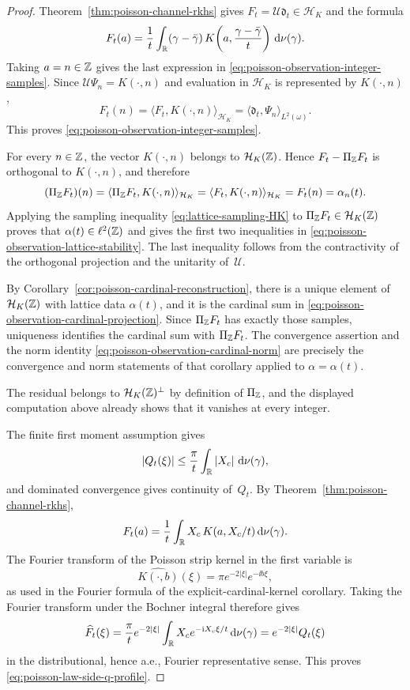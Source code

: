 \begin{proof}
Theorem~\ref{thm:poisson-channel-rkhs} gives
$F_t=\mathcal U\mathfrak d_t\in\mathcal H_K$ and the formula
\[
F_t(a)=\frac1t\int_{\mathbb{R}}
(\gamma-\bar{\gamma})\,
K\!\left(a,\frac{\gamma-\bar{\gamma}}{t}\right)\,\mathrm{d}\nu(\gamma).
\]
Taking $a=n\in\mathbb{Z}$ gives the last expression in
\eqref{eq:poisson-observation-integer-samples}.  Since
$\mathcal U\Psi_n=K(\cdot,n)$ and evaluation in $\mathcal H_K$ is
represented by $K(\cdot,n)$,
\[
F_t(n)
=\langle F_t,K(\cdot,n)\rangle_{\mathcal H_K}
=\langle \mathfrak d_t,\Psi_n\rangle_{L^2(\omega)}.
\]
This proves \eqref{eq:poisson-observation-integer-samples}.

For every $n\in\mathbb{Z}$, the vector $K(\cdot,n)$ belongs to
$\mathcal H_K(\mathbb{Z})$.  Hence
$F_t-\Pi_{\mathbb{Z}}F_t$ is orthogonal to $K(\cdot,n)$, and therefore
\[
(\Pi_{\mathbb{Z}}F_t)(n)
=\langle \Pi_{\mathbb{Z}}F_t,K(\cdot,n)\rangle_{\mathcal H_K}
=\langle F_t,K(\cdot,n)\rangle_{\mathcal H_K}
=F_t(n)=\alpha_n(t).
\]
Applying the sampling inequality \eqref{eq:lattice-sampling-HK} to
$\Pi_{\mathbb{Z}}F_t\in\mathcal H_K(\mathbb{Z})$ proves that
$\alpha(t)\in\ell^2(\mathbb{Z})$ and gives the first two inequalities in
\eqref{eq:poisson-observation-lattice-stability}.  The last inequality
follows from the contractivity of the orthogonal projection and the
unitarity of~$\mathcal U$.

By Corollary~\ref{cor:poisson-cardinal-reconstruction}, there is a unique
element of $\mathcal H_K(\mathbb{Z})$ with lattice data $\alpha(t)$, and it is
the cardinal sum in
\eqref{eq:poisson-observation-cardinal-projection}.  Since
$\Pi_{\mathbb{Z}}F_t$ has exactly those samples, uniqueness identifies the
cardinal sum with $\Pi_{\mathbb{Z}}F_t$.  The convergence assertion and the norm
identity \eqref{eq:poisson-observation-cardinal-norm} are precisely the
convergence and norm statements of that corollary applied to
$\alpha=\alpha(t)$.

The residual belongs to $\mathcal H_K(\mathbb{Z})^\perp$ by definition of
$\Pi_{\mathbb{Z}}$, and the displayed computation above already shows that it
vanishes at every integer.

The finite first moment assumption gives
\[
|Q_t(\xi)|\le \frac{\pi}{t}\int_{\mathbb{R}}|X_c|\,\,\mathrm{d}\nu(\gamma),
\]
and dominated convergence gives continuity of~$Q_t$.  By
Theorem~\ref{thm:poisson-channel-rkhs},
\[
F_t(a)=\frac1t\int_{\mathbb{R}}X_c\,K(a,X_c/t)\,\mathrm{d}\nu(\gamma).
\]
The Fourier transform of the Poisson strip kernel in the first variable is
\[
\widehat{K(\cdot,b)}(\xi)=\pi e^{-2|\xi|}e^{-\ii b\xi},
\]
as used in the Fourier formula of the explicit-cardinal-kernel corollary.
Taking the Fourier transform
under the Bochner integral therefore gives
\[
\widehat F_t(\xi)
=\frac{\pi}{t}e^{-2|\xi|}
\int_{\mathbb{R}}X_c e^{-\mathrm{i} X_c\xi/t}\,\mathrm{d}\nu(\gamma)
=e^{-2|\xi|}Q_t(\xi)
\]
in the distributional, hence a.e., Fourier representative sense.  This proves
\eqref{eq:poisson-law-side-q-profile}.


\end{proof}

